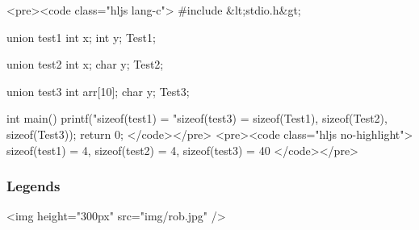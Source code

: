 \documentclass{../c-lecture}
\begin{document}
\begin{frame}
  <pre><code class="hljs lang-c">
#include &lt;stdio.h&gt;

union test1 {
    int x;
    int y;
} Test1;

union test2 {
    int x;
    char y;
} Test2;

union test3 {
    int arr[10];
    char y;
} Test3;

int main()
{
    printf("sizeof(test1) = %
           "sizeof(test3) = %
           sizeof(Test1),
           sizeof(Test2), sizeof(Test3));
    return 0;
}
  </code></pre>
  <pre><code class="hljs no-highlight">
sizeof(test1) = 4, sizeof(test2) = 4, sizeof(test3) = 40
  </code></pre>
\end{frame}
\begin{frame}
  \begin{frame}
    \frametitle{Legends}
    <img height="300px" src="img/rob.jpg" />
  \end{frame}
\end{frame}
\end{document}
